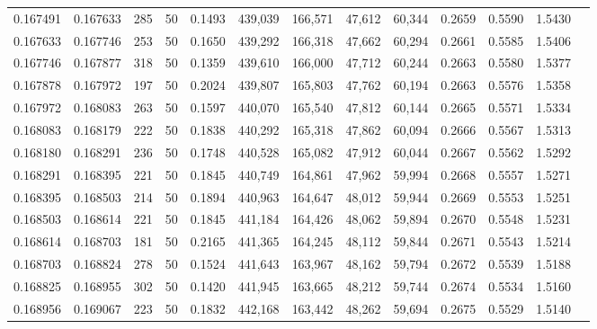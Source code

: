 \begin{tabular}{rrrrrrrrrrrrr}
0.167491 & 0.167633 &   285 &  50 &                                     0.1493 & 439,039 & 166,571 &  47,612 &  60,344 & 0.2659 & 0.5590 & 1.5430 \\
0.167633 & 0.167746 &   253 &  50 &                                     0.1650 & 439,292 & 166,318 &  47,662 &  60,294 & 0.2661 & 0.5585 & 1.5406 \\
0.167746 & 0.167877 &   318 &  50 &                                     0.1359 & 439,610 & 166,000 &  47,712 &  60,244 & 0.2663 & 0.5580 & 1.5377 \\
0.167878 & 0.167972 &   197 &  50 &                                     0.2024 & 439,807 & 165,803 &  47,762 &  60,194 & 0.2663 & 0.5576 & 1.5358 \\
0.167972 & 0.168083 &   263 &  50 &                                     0.1597 & 440,070 & 165,540 &  47,812 &  60,144 & 0.2665 & 0.5571 & 1.5334 \\
0.168083 & 0.168179 &   222 &  50 &                                     0.1838 & 440,292 & 165,318 &  47,862 &  60,094 & 0.2666 & 0.5567 & 1.5313 \\
0.168180 & 0.168291 &   236 &  50 &                                     0.1748 & 440,528 & 165,082 &  47,912 &  60,044 & 0.2667 & 0.5562 & 1.5292 \\
0.168291 & 0.168395 &   221 &  50 &                                     0.1845 & 440,749 & 164,861 &  47,962 &  59,994 & 0.2668 & 0.5557 & 1.5271 \\
0.168395 & 0.168503 &   214 &  50 &                                     0.1894 & 440,963 & 164,647 &  48,012 &  59,944 & 0.2669 & 0.5553 & 1.5251 \\
0.168503 & 0.168614 &   221 &  50 &                                     0.1845 & 441,184 & 164,426 &  48,062 &  59,894 & 0.2670 & 0.5548 & 1.5231 \\
0.168614 & 0.168703 &   181 &  50 &                                     0.2165 & 441,365 & 164,245 &  48,112 &  59,844 & 0.2671 & 0.5543 & 1.5214 \\
0.168703 & 0.168824 &   278 &  50 &                                     0.1524 & 441,643 & 163,967 &  48,162 &  59,794 & 0.2672 & 0.5539 & 1.5188 \\
0.168825 & 0.168955 &   302 &  50 &                                     0.1420 & 441,945 & 163,665 &  48,212 &  59,744 & 0.2674 & 0.5534 & 1.5160 \\
0.168956 & 0.169067 &   223 &  50 &                                     0.1832 & 442,168 & 163,442 &  48,262 &  59,694 & 0.2675 & 0.5529 & 1.5140 \\

\end{tabular}
